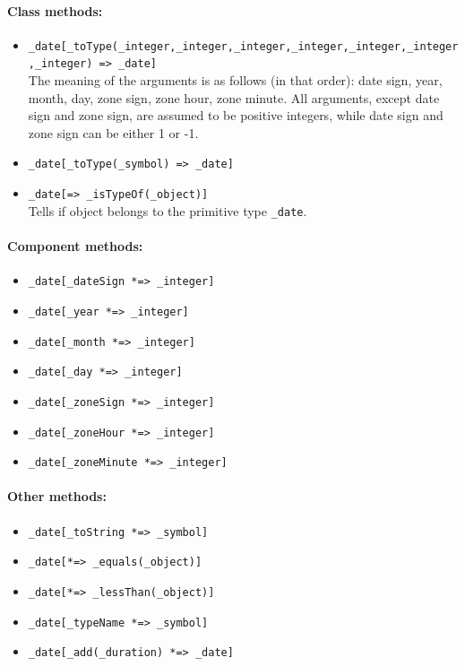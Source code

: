 \documentclass[11pt]{article}
\begin{document}
\paragraph{Class methods:}
\begin{itemize}
    \item {\tt \_date[\_toType(\_integer,\_integer,\_integer,\_integer,\_integer,\_integer,\_integer) => \_date]}
      \\
      The meaning of the arguments is as follows (in that order): date sign, year, month, day, zone sign, zone hour, zone minute.
    All arguments, except date sign and zone sign, are assumed to be
    positive integers, while date sign and zone sign can be either 1 or
    -1. 
    \item {\tt \_date[\_toType(\_symbol) => \_date]}
    \item {\tt \_date[=> \_isTypeOf(\_object)]}\\
      Tells if object belongs to the primitive type {\tt \_date}. 
\end{itemize}

\paragraph{Component methods:}
\begin{itemize}
\item {\tt \_date[\_dateSign *=> \_integer]}   
\item {\tt \_date[\_year *=> \_integer]}   
\item {\tt \_date[\_month *=> \_integer]}  
\item {\tt \_date[\_day *=> \_integer]}   
\item {\tt \_date[\_zoneSign *=> \_integer]}   
\item {\tt \_date[\_zoneHour *=> \_integer]}  
\item {\tt \_date[\_zoneMinute *=> \_integer]}    
\end{itemize}

\paragraph{Other methods:}
\begin{itemize}
\item {\tt \_date[\_toString *=> \_symbol]}   
\item {\tt \_date[*=> \_equals(\_object)]}   
\item {\tt \_date[*=> \_lessThan(\_object)]}   
\item {\tt \_date[\_typeName *=> \_symbol]}   
\item {\tt \_date[\_add(\_duration) *=> \_date]}   
\end{itemize}
\end{document}

